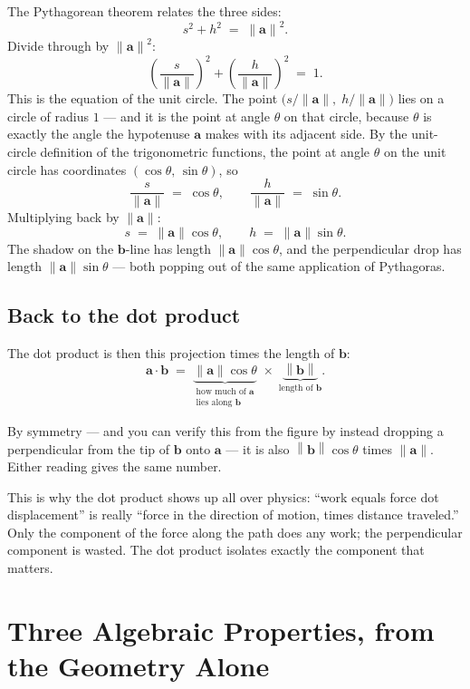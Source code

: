 \documentclass[11pt]{article}
\newcommand{\vect}[1]{\mathbf{#1}}
\newcommand{\norm}[1]{\left\lVert #1 \right\rVert}
\begin{document}
The Pythagorean theorem relates the three sides:
\[
  s^2 + h^2 \;=\; \norm{\vect{a}}^2.
\]
Divide through by $\norm{\vect{a}}^2$:
\[
  \left(\frac{s}{\norm{\vect{a}}}\right)^2 + \left(\frac{h}{\norm{\vect{a}}}\right)^2 \;=\; 1.
\]
This is the equation of the unit circle. The point
\(\bigl(s/\norm{\vect{a}},\; h/\norm{\vect{a}}\bigr)\)
lies on a circle of radius $1$ --- and it is the point at angle $\theta$ on that circle, because $\theta$ is exactly the angle the hypotenuse $\vect{a}$ makes with its adjacent side. By the unit-circle definition of the trigonometric functions, the point at angle $\theta$ on the unit circle has coordinates $(\cos\theta,\,\sin\theta)$, so
\[
  \frac{s}{\norm{\vect{a}}} \;=\; \cos\theta, \qquad \frac{h}{\norm{\vect{a}}} \;=\; \sin\theta.
\]
Multiplying back by $\norm{\vect{a}}$:
\[
  \boxed{\,s \;=\; \norm{\vect{a}}\cos\theta, \qquad h \;=\; \norm{\vect{a}}\sin\theta.\,}
\]
The shadow on the $\vect{b}$-line has length $\norm{\vect{a}}\cos\theta$, and the perpendicular drop has length $\norm{\vect{a}}\sin\theta$ --- both popping out of the same application of Pythagoras.

\subsection*{Back to the dot product}

The dot product is then this projection times the length of $\vect{b}$:
\[
  \vect{a}\cdot\vect{b} \;=\; \underbrace{\norm{\vect{a}}\cos\theta}_{\substack{\text{how much of }\vect{a}\\ \text{lies along }\vect{b}}} \;\times\; \underbrace{\norm{\vect{b}}}_{\text{length of }\vect{b}}.
\]

By symmetry — and you can verify this from the figure by instead dropping a perpendicular from the tip of $\vect{b}$ onto $\vect{a}$ — it is also $\norm{\vect{b}}\cos\theta$ times $\norm{\vect{a}}$. Either reading gives the same number.

This is why the dot product shows up all over physics: ``work equals force dot displacement'' is really ``force in the direction of motion, times distance traveled.'' Only the component of the force along the path does any work; the perpendicular component is wasted. The dot product isolates exactly the component that matters.

\section{Three Algebraic Properties, from the Geometry Alone}
\end{document}
